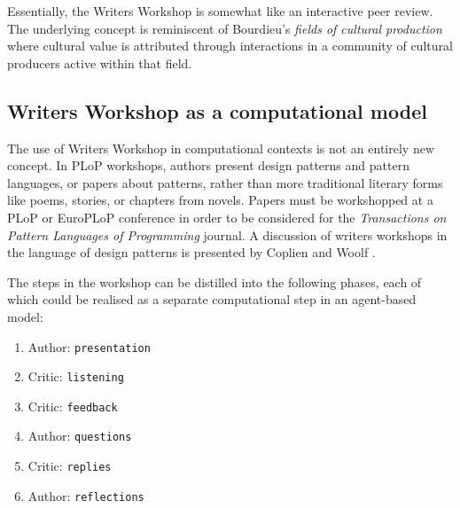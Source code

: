 Essentially, the Writers Workshop is somewhat like an interactive peer review. The underlying concept is reminiscent of Bourdieu's {\em fields of cultural production} \cite{bourdieu93} where cultural value is attributed through interactions in a community of cultural producers active within that field. 

\subsection{Writers Workshop as a computational model}\label{sec:ww-model}

The use of Writers Workshop in computational contexts is not an
entirely new concept. In PLoP workshops, authors present design
patterns and pattern languages, or papers about patterns, rather than
more traditional literary forms like poems, stories, or chapters from
novels.  Papers must be workshopped at a PLoP or EuroPLoP conference
in order to be considered for the \emph{Transactions on Pattern
  Languages of Programming} journal.  A discussion of writers
workshops in the language of design patterns is presented by Coplien
and Woolf \citeyear{coplien1997pattern}. %
%

The steps in the workshop can be distilled into the following phases,
each of which could be realised as a separate computational step in an
agent-based model:
\begin{center}
\begin{fminipage}{.53\columnwidth}
\begin{enumerate}[itemsep=0pt]
\item Author: {\tt presentation}
\item Critic: {\tt listening}
\item Critic: {\tt feedback}
\item Author: {\tt questions}
\item Critic: {\tt replies}
\item Author: {\tt reflections}
\end{enumerate}
\end{fminipage}
\end{center}

